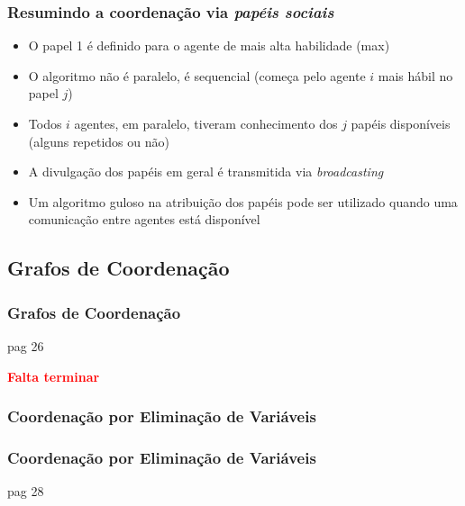 \begin{frame}%
\frametitle{Resumindo a coordenação via \textit{papéis sociais}}

\begin{itemize}
  \item O papel 1 é definido para o agente de mais alta habilidade (max)

  \item O algoritmo não é paralelo, é sequencial (começa pelo  agente $i$
  mais hábil no papel $j$)

  \item Todos $i$ agentes, em paralelo, tiveram conhecimento dos $j$ papéis disponíveis (alguns repetidos ou não)

  \item A divulgação dos papéis em geral é transmitida via
\textit{broadcasting}

 \item Um algoritmo guloso na atribuição dos papéis pode ser utilizado 
quando uma comunicação entre agentes está disponível
  
\end{itemize}


\end{frame}

\subsection{Grafos de Coordenação}

\begin{frame}
\frametitle{Grafos de Coordenação}

pag 26


\begin{huge}

\textbf{ \textcolor{red}{Falta terminar}}
 

\end{huge}
\end{frame}


\subsubsection{Coordenação por Eliminação de Variáveis}

\begin{frame}
\frametitle{Coordenação por Eliminação de Variáveis}

pag 28


\end{frame}


